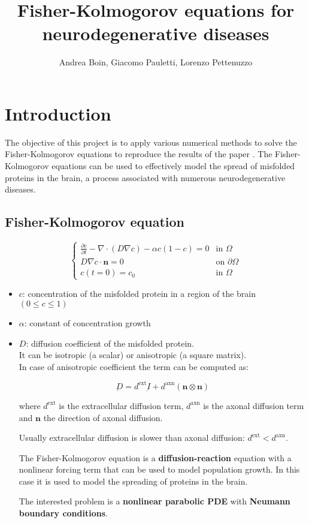\documentclass[12pt, letterpaper]{article}
\title{Fisher-Kolmogorov equations for neurodegenerative diseases}
\author{Andrea Boin, Giacomo Pauletti, Lorenzo Pettenuzzo}
\date{}
\begin{document}
\maketitle
\pagebreak

\tableofcontents
\pagebreak

\section{Introduction}
The objective of this project is to apply various numerical methods to solve the Fisher-Kolmogorov equations to reproduce the results of the paper \cite{diffusion-paper}. The Fisher-Kolmogorov equations can be used to effectively model the spread of misfolded proteins in the brain, a process associated with numerous neurodegenerative diseases.

\subsection{Fisher-Kolmogorov equation}
\[
\begin{cases}
\displaystyle \frac{\partial c}{\partial t} - \nabla \cdot (D \nabla c) - \alpha c(1 - c) = 0 & \text{in } \Omega\\
\displaystyle D \nabla c \cdot \mathbf{n} = 0 & \text{on } \partial \Omega\\
c(t=0)=c_0 & \text{in } \Omega
\end{cases}
\]
\begin{itemize}
    \item $c$: concentration of the misfolded protein in a region of the brain $(0\leq c\leq1)$
    \item $\alpha$: constant of concentration growth
    \item $D$: diffusion coefficient of the misfolded protein.\\
It can be isotropic (a scalar) or anisotropic (a square matrix).\\
In case of anisotropic coefficient the term can be computed as:

$$\underbar{D}=d^{\text{ext}}\underbar{I}+d^{\text{axn}}(\mathbf{n}\otimes\mathbf{n})$$

where $d^{\text{ext}}$ is the extracellular diffusion term, $d^{\text{axn}}$ is the axonal diffusion term and $\mathbf{n}$ the direction of axonal diffusion.

Usually extracellular diffusion is slower than axonal diffusion: $d^{\text{ext}}<d^{\text{axn}}$.

The Fisher-Kolmogorov equation is a \textbf{diffusion-reaction} equation with a nonlinear forcing term that can be used to model population growth. In this case it is used to model the spreading of proteins in the brain.

The interested problem is a \textbf{nonlinear parabolic PDE} with \textbf{Neumann boundary conditions}.
\end{itemize} 
\pagebreak
\end{document}
